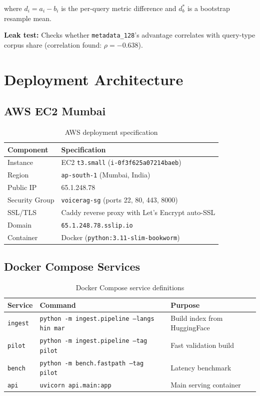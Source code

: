 \documentclass[12pt,a4paper]{article}
\begin{document}
where $d_i = a_i - b_i$ is the per-query metric difference and $d_b^*$ is a bootstrap resample mean.

\textbf{Leak test:} Checks whether \texttt{metadata\_128}'s advantage correlates with query-type corpus share (correlation found: $\rho = -0.638$).


\section{Deployment Architecture}

\subsection{AWS EC2 Mumbai}

\begin{table}[H]
\centering
\begin{tabular}{ll}
\toprule
\textbf{Component} & \textbf{Specification} \\
\midrule
Instance          & EC2 \texttt{t3.small} (\texttt{i-0f3f625a07214baeb}) \\
Region            & \texttt{ap-south-1} (Mumbai, India) \\
Public IP         & 65.1.248.78 \\
Security Group    & \texttt{voicerag-sg} (ports 22, 80, 443, 8000) \\
SSL/TLS           & Caddy reverse proxy with Let's Encrypt auto-SSL \\
Domain            & \texttt{65.1.248.78.sslip.io} \\
Container         & Docker (\texttt{python:3.11-slim-bookworm}) \\
\bottomrule
\end{tabular}
\caption{AWS deployment specification}
\end{table}

\subsection{Docker Compose Services}

\begin{table}[H]
\centering
\small
\begin{tabularx}{\textwidth}{l l X}
\toprule
\textbf{Service} & \textbf{Command} & \textbf{Purpose} \\
\midrule
\texttt{ingest} & \texttt{python -m ingest.pipeline --langs hin mar} & Build index from HuggingFace \\
\texttt{pilot}  & \texttt{python -m ingest.pipeline --tag pilot}     & Fast validation build \\
\texttt{bench}  & \texttt{python -m bench.fastpath --tag pilot}      & Latency benchmark \\
\texttt{api}    & \texttt{uvicorn api.main:app}                      & Main serving container \\
\bottomrule
\end{tabularx}
\caption{Docker Compose service definitions}
\end{table}
\end{document}
